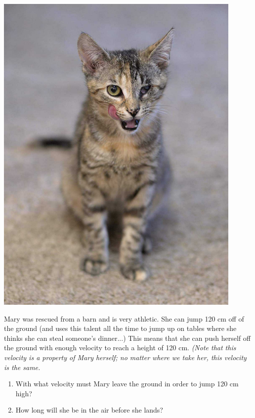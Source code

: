 \documentclass[12pt]{article}
\begin{document}
\begin{enumerate}
\bigskip
\begin{minipage}{0.45\textwidth}

	\includegraphics[width=0.9\textwidth]{mary1.jpg}
\end{minipage}
\begin{minipage}{0.55\textwidth} Mary was rescued from a barn and is very athletic. She can jump 120 cm off of the ground (and uses this talent all the time to jump up on tables where she thinks she can steal someone's dinner...) This means that she can push herself off the ground with enough velocity to reach a height of 120 cm. {\it (Note that this velocity is a property of Mary herself; no matter where we take her, this velocity is the same.}

\begin{enumerate}
\item With what velocity must Mary leave the ground in order to jump 120 cm high?
\item How long will she be in the air before she lands?
\end{enumerate}
\end{minipage}
\newpage



\end{enumerate}
\end{document}
